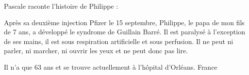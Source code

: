 Pascale raconte l'histoire de Philippe :

Après sa deuxième injection Pfizer le 15 septembre, Philippe, le papa de mon
fils de 7 ans, a développé le syndrome de Guillain Barré. Il est paralysé à
l'exception de ses mains, il est sous respiration artificielle et sous
perfusion. Il ne peut ni parler, ni marcher, ni ouvrir les yeux et ne peut donc
pas lire.

Il n'a que 63 ans et se trouve actuellement à l'hôpital d'Orléans. France

